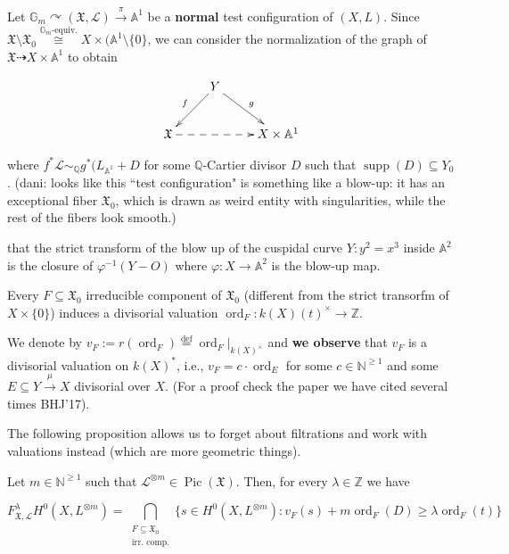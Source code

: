 \medskip{}
Let $\mathbb{G}_m \curvearrowright
(\mathfrak{X},\mathcal{L})\xrightarrow{\pi}
\mathbb{A}^1$
be a \textbf{normal} test configuration of
$(X,L)$. Since $\mathfrak{X}\setminus
\mathfrak{X}_0
\overset{\mathbb{G}_m\text{-equiv.} }{\cong}X
\times (\mathbb{A}^1 \setminus\{0\}$, we can
consider the normalization of the graph of
$\mathfrak{X} \dashrightarrow X \times
\mathbb{A}^1$ to obtain

$$
\xymatrix{&Y\ar[dl]_{f}\ar[dr]^{g}&\\
\mathfrak{X}\ar@{-->}[rr]&&X\times
\mathbb{A}^1}
$$

where $f^*\mathcal{L} \sim_\mathbb{Q}g^*
(L_{\mathbb{A}^1}+D$ for some
$\mathbb{Q}$-Cartier divisor $D$ such that
$\operatorname{supp}(D) \subseteq Y_0$.
{(dani: looks like this ``test configuration"
is something like a blow-up: it has an
exceptional fiber $\mathfrak{X}_0$, which is
drawn as weird entity with singularities,
while the rest of the fibers look smooth.)}

\medskip{}
that the strict transform of the blow up of
the cuspidal curve $Y:y^2=x^3$ inside
$\mathbb{A}^2$ is the closure of
$\varphi^{-1}(Y-O)$ where $\varphi:X \to
\mathbb{A}^2$ is the blow-up map.

\medskip{}
Every $F \subseteq \mathfrak{X}_0$
irreducible component of $\mathfrak{X}_0$
(different from the strict transorfm of $X
\times \{0\}$) induces a divisorial valuation
$\operatorname{ord}_F: k (X)(t)^\times
\longrightarrow \mathbb{Z}$.

We denote by $v_F:= r
(\operatorname{ord}_F)\overset{
\operatorname{def}}{=}
\operatorname{ord}_F |_{k(X)^\times}$ and
\textbf{we observe} that $v_F$ is a
divisorial valuation on $k(X)^*$, i.e.,
$v_F=c\cdot \operatorname{ord}_E$ for some $c
\in \mathbb{N}^{\geq 1}$ and some $E
\subseteq Y \xrightarrow{\mu}X$ divisorial
over $X$. (For a proof check the paper we
have cited several times BHJ'17).

The following proposition allows us to forget
about filtrations and work with valuations
instead (which are more geometric things).

\begin{proposition}
\label{proposition-montero-1}
Let $m \in \mathbb{N}^{\geq 1}$ such that
$\mathcal{L}^{\otimes m} \in
\operatorname{Pic}(\mathfrak{X})$. Then, for
every $\lambda \in \mathbb{Z}$ we have

$$
F^\lambda_{\mathfrak{X},\mathcal{L}}H^{0}(X,
L^{\otimes
m})=\bigcap_{\substack{F \subseteq
\mathfrak{X}_0 \\ \text{irr. comp.} }}\{s \in
H^{0}(X,L^{\otimes m}):v_F(s)+m
\operatorname{ord}_F(D) \geq \lambda
\operatorname{ord}_F(t)\}
$$

\end{proposition}


